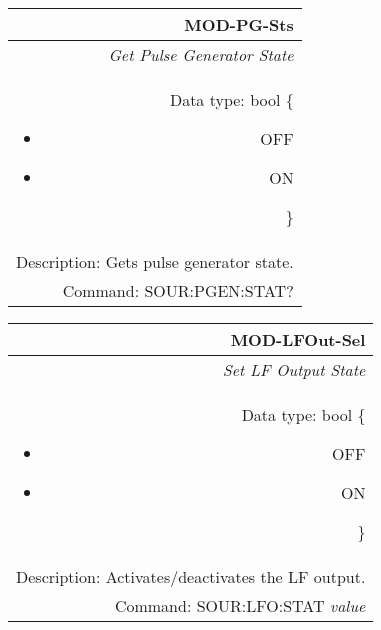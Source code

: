 \documentclass[openany]{article}
\begin{document}
		\begin{tabular}{N}
			\hline
			\bfseries MOD-PG-Sts \\ \hline
			\emph{Get Pulse Generator State} \\
			Data type: bool \{\begin{itemize}[noitemsep]
				\small
				\item[] OFF
				\item[] ON
			\end{itemize}\} \\
			Description: Gets pulse generator state. \\
			Command: SOUR:PGEN:STAT? \\
			
		\end{tabular}
%
		\begin{tabular}{N}
			\hline
			\bfseries MOD-LFOut-Sel \\ \hline
			\emph{Set LF Output State} \\
			Data type: bool \{\begin{itemize}[noitemsep]
				\small
				\item[] OFF
				\item[] ON
			\end{itemize}\} \\
			Description: Activates/deactivates the LF output. \\
			Command: SOUR:LFO:STAT \emph{value} \\

		\end{tabular}
\end{document}
